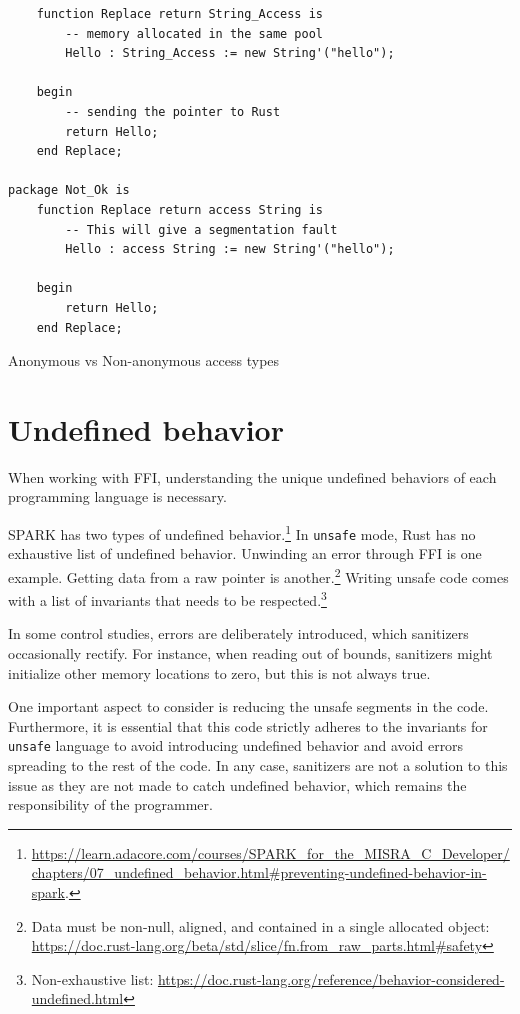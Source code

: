 \documentclass[nomenclature, english, bibtex]{kththesis}
\begin{document}
{\begin{listing}[!ht]
\begin{verbatim}
    function Replace return String_Access is
        -- memory allocated in the same pool
        Hello : String_Access := new String'("hello");

    begin
        -- sending the pointer to Rust
        return Hello;
    end Replace;

package Not_Ok is
    function Replace return access String is
        -- This will give a segmentation fault
        Hello : access String := new String'("hello");

    begin
        return Hello;
    end Replace;
\end{verbatim}
\caption{Anonymous vs Non-anonymous access types}
\label{lst:samepool}
\end{listing}
\FloatBarrier

\section{Undefined behavior}
\label{sec:undefinied-behavior}
When working with \gls{FFI}, understanding the unique undefined behaviors of each programming language is necessary. 

SPARK has two types of undefined behavior.\footnote{\url{https://learn.adacore.com/courses/SPARK_for_the_MISRA_C_Developer/chapters/07_undefined_behavior.html\#preventing-undefined-behavior-in-spark}.}
In \texttt{unsafe} mode, Rust has no exhaustive list of undefined behavior. Unwinding an error through FFI is one example. Getting data from a raw pointer is another.\footnote{Data must be non-null, aligned, and contained in a single allocated object: \url{https://doc.rust-lang.org/beta/std/slice/fn.from_raw_parts.html\#safety}}
Writing unsafe code comes with a list of invariants that needs to be respected.\footnote{Non-exhaustive list: \url{https://doc.rust-lang.org/reference/behavior-considered-undefined.html}}

In some control studies, errors are deliberately introduced, which sanitizers occasionally rectify. For instance, when reading out of bounds, sanitizers might initialize other memory locations to zero, but this is not always true.

One important aspect to consider is reducing the unsafe segments in the code. Furthermore, it is essential that this code strictly adheres to the invariants for \texttt{unsafe} language to avoid introducing undefined behavior and avoid errors spreading to the rest of the code. In any case, sanitizers are not a solution to this issue as they are not made to catch undefined behavior, which remains the responsibility of the programmer.

}
\end{document}
